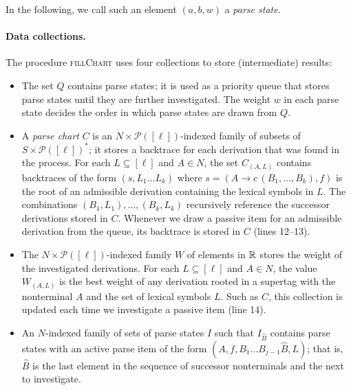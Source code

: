 \documentclass[../../document.tex]{subfiles}
\begin{document}
    In the following, we call such an element \((a,b,w)\) a \emph{parse state}.

    \paragraph{Data collections.} The procedure \textsc{fillChart} uses four collections to store (intermediate) results:
    \begin{itemize}
        \item The set \(Q\) contains parse states; it is used as a priority queue that stores parse states until they are further investigated.
            The weight \(w\) in each parse state decides the order in which parse states are drawn from \(Q\).
        \item A \emph{parse chart} \(C\) is an \(N \times \mathcal{P}([\ell])\)-indexed family of subsets of \(S \times \mathcal{P}([\ell])^*\); it stores a backtrace for each derivation that was found in the process.
            For each \(L \subseteq [\ell]\) and \(A \in N\), the set \(C_{(A, L)}\) contains backtraces of the form \((s, L_1 \ldots L_k)\) where \(s = (A \to c\,(B_1, \ldots, B_k), f)\) is the root of an admissible derivation containing the lexical symbols in \(L\).
            The combinations \((B_1, L_1), \ldots, (B_k, L_k)\) recursively reference the successor derivations stored in \(C\).
            Whenever we draw a passive item for an admissible derivation from the queue, its backtrace is stored in \(C\) (lines 12--13).
        \item The \(N\times \mathcal{P}([\ell])\)-indexed family \(W\) of elements in \(\mathbb{R}\) stores the weight of the investigated derivations.
            For each \(L \subseteq [\ell]\) and \(A \in N\), the value \(W_{(A, L)}\) is the best weight of any derivation rooted in a supertag with the  nonterminal \(A\) and the set of lexical symbols \(L\).
            Such as \(C\), this collection is updated each time we investigate a passive item (line 14).
        \item An \(N\)-indexed family of sets of parse states \(I\) such that \(I_{\hat{B}}\) contains parse states with an active parse item of the form \((A, f, B_1\ldots B_{j-1}\hat{B},L)\); that is, \(\hat{B}\) is the last element in the sequence of successor nonterminals and the next to investigate.
    \end{itemize}
\end{document}
